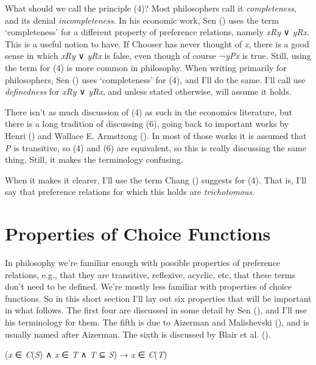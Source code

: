 \documentclass[
  11pt,
  letterpaper,
  DIV=11,
  numbers=noendperiod,
  twoside]{scrartcl}
\providecommand{\tightlist}{%
  \setlength{\itemsep}{0pt}\setlength{\parskip}{0pt}}
\begin{document}
What should we call the principle (4)? Most philosophers call it
\emph{completeness}, and its denial \emph{incompleteness}. In his
economic work, Sen () uses the
term `completeness' for a different property of preference relations,
namely \emph{xRy} ∨ \emph{yRx}. This is a useful notion to have. If
Chooser has never thought of \emph{x}, there is a good sense in which
\emph{xRy} ∨ \emph{yRx} is false, even though of course ¬\emph{yPx} is
true. Still, using the term for (4) is more common in philosophy. When
writing primarily for philosophers, Sen ()
uses `completeness' for (4), and I'll do the same. I'll call use
\emph{definedness} for \emph{xRy} ∨ \emph{yRx}, and unless stated
otherwise, will assume it holds.

There isn't as much discussion of (4) as such in the economics
literature, but there is a long tradition of discussing (6), going back
to important works by Henri
() and Wallace E.
Armstrong (). In most of those works
it is assumed that \emph{P} is transitive, so (4) and (6) are
equivalent, so this is really discussing the same thing. Still, it makes
the terminology confusing.

When it makes it clearer, I'll use the term Chang
() suggests for (4). That is, I'll say
that preference relations for which this holds are \emph{trichotomous}.

\section{Properties of Choice Functions}\label{sec-properties}

In philosophy we're familiar enough with possible properties of
preference relations, e.g., that they are transitive, reflexive,
acyclic, etc, that these terms don't need to be defined. We're mostly
less familiar with properties of choice functions. So in this short
section I'll lay out six properties that will be important in what
follows. The first four are discussed in some detail by Sen
(), and I'll use his
terminology for them. The fifth is due to Aizerman and Malishevski
(), and is usually named after
Aizerman. The sixth is discussed by Blair et al.
().

\begin{description}
\tightlist
\item[Property α]
(\emph{x} ∈ \emph{C}(\emph{S}) ∧ \emph{x} ∈ \emph{T} ∧ \emph{T} ⊆
\emph{S}) → \emph{x} ∈ \emph{C}(\emph{T})
\end{description}
\end{document}
